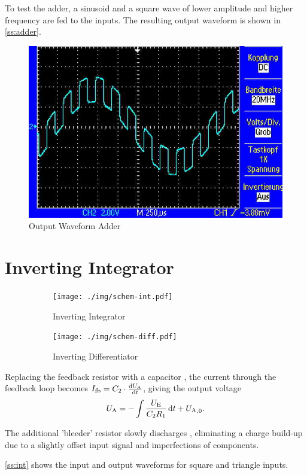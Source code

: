 To test the adder, a sinusoid and a square wave of lower amplitude and higher frequency are fed to the inputs.
The resulting output waveform is shown in \autoref{ss:adder}.

\begin{figure}
	\centering
	\includegraphics[width=.4\linewidth]{./img/ss-adder}
	\caption{Output Waveform Adder}
	\label{ss:adder}
\end{figure}

\section{Inverting Integrator}

\begin{figure}
	\centering
	\begin{subfigure}{0.4\textwidth}
		\centering
		\texttt{[image: ./img/schem-int.pdf]}
		\caption{Inverting Integrator}
		\label{schem:int}
	\end{subfigure}
	\begin{subfigure}{0.4\textwidth}
		\centering
		\texttt{[image: ./img/schem-diff.pdf]}
		\caption{Inverting Differentiator}
		\label{schem:diff}
	\end{subfigure}
	\caption{}
\end{figure}

Replacing the feedback resistor  with a capacitor , the current through the feedback loop becomes $I_\text{fb} = C_2 \cdot \frac{\mathop{}\!\mathrm{d} U_\text{A}}{\mathop{}\!\mathrm{d} t}$, giving the output voltage \[U_\text{A} = - \int \frac{U_\text{E}}{C_2 R_1} \mathop{}\!\mathrm{d} t + {U_\text{A}}_{,0}.\]

The additional 'bleeder' resistor  slowly discharges , eliminating a charge build-up due to a slightly offset input signal and imperfections of components.

\autoref{ss:int} shows the input and output waveforms for square and triangle inputs.

